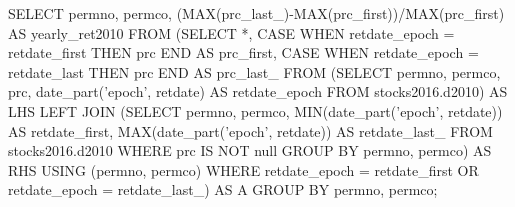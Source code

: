 SELECT permno, permco,
 (MAX(prc_last_)-MAX(prc_first))/MAX(prc_first) AS yearly_ret2010
FROM
 (SELECT *,
   CASE
     WHEN retdate_epoch = retdate_first THEN prc
   END AS prc_first,
   CASE
     WHEN retdate_epoch = retdate_last THEN prc
   END AS prc_last_
 FROM
   (SELECT permno, permco, prc,
     date_part('epoch', retdate) AS retdate_epoch
   FROM stocks2016.d2010) AS LHS
 LEFT JOIN
   (SELECT permno, permco,
     MIN(date_part('epoch', retdate)) AS retdate_first,
     MAX(date_part('epoch', retdate)) AS retdate_last_
   FROM stocks2016.d2010
   WHERE prc IS NOT null 
   GROUP BY permno, permco) AS RHS
 USING (permno, permco)
 WHERE retdate_epoch = retdate_first OR retdate_epoch = retdate_last_) AS A
GROUP BY permno, permco;
